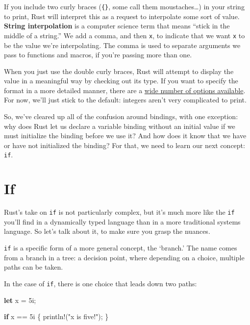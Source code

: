 \documentclass[]{article}
\newenvironment{Shaded}{}{}
\newcommand{\KeywordTok}[1]{\textcolor[rgb]{0.00,0.44,0.13}{\textbf{{#1}}}}
\newcommand{\DecValTok}[1]{\textcolor[rgb]{0.25,0.63,0.44}{{#1}}}
\newcommand{\StringTok}[1]{\textcolor[rgb]{0.25,0.44,0.63}{{#1}}}
\newcommand{\OtherTok}[1]{\textcolor[rgb]{0.00,0.44,0.13}{{#1}}}
\newcommand{\NormalTok}[1]{{#1}}
\begin{document}
If you include two curly braces (\texttt{\{\}}, some call them
moustaches\ldots{}) in your string to print, Rust will interpret this as
a request to interpolate some sort of value. \textbf{String
interpolation} is a computer science term that means ``stick in the
middle of a string.'' We add a comma, and then \texttt{x}, to indicate
that we want \texttt{x} to be the value we're interpolating. The comma
is used to separate arguments we pass to functions and macros, if you're
passing more than one.

When you just use the double curly braces, Rust will attempt to display
the value in a meaningful way by checking out its type. If you want to
specify the format in a more detailed manner, there are a
\href{/std/fmt/index.html}{wide number of options available}. For now,
we'll just stick to the default: integers aren't very complicated to
print.

So, we've cleared up all of the confusion around bindings, with one
exception: why does Rust let us declare a variable binding without an
initial value if we must initialize the binding before we use it? And
how does it know that we have or have not initialized the binding? For
that, we need to learn our next concept: \texttt{if}.

\section{If}\label{if}

Rust's take on \texttt{if} is not particularly complex, but it's much
more like the \texttt{if} you'll find in a dynamically typed language
than in a more traditional systems language. So let's talk about it, to
make sure you grasp the nuances.

\texttt{if} is a specific form of a more general concept, the `branch.'
The name comes from a branch in a tree: a decision point, where
depending on a choice, multiple paths can be taken.

In the case of \texttt{if}, there is one choice that leads down two
paths:

\begin{Shaded}
\begin{Highlighting}[]
\KeywordTok{let} \NormalTok{x = }\DecValTok{5i}\NormalTok{;}

\KeywordTok{if} \NormalTok{x == }\DecValTok{5i} \NormalTok{\{}
    \OtherTok{println!}\NormalTok{(}\StringTok{"x is five!"}\NormalTok{);}
\NormalTok{\}}
\end{Highlighting}
\end{Shaded}
\end{document}

